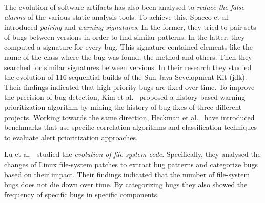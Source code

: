 \documentclass[letterpaper,twocolumn,10pt]{article}
\begin{document}
The evolution of software artifacts has also been analysed to {\it reduce the false
alarms} of the various static analysis tools. To achieve this, Spacco et
al.~\cite{SHP06} introduced {\it pairing} and {\it warning signatures}. In the
former, they tried to pair sets of bugs between versions in order to find
similar patterns. In the latter, they computed a signature for every bug. This
signature contained elements like the name of the class where the bug was found,
the method and others. Then they searched for similar signatures between
versions. In their research they studied the evolution of 116 sequential
builds of the Sun Java Sevelopment Kit ({\sc jdk}). Their findings indicated that
high priority bugs are fixed over time. To improve the precision of bug
detection, Kim et al.~\cite{KE07b} proposed a history-based warning
prioritization algorithm by mining the history of bug-fixes of three
different projects. Working towards the same direction, Heckman
et al.~\cite{HW09,HW08} have introduced benchmarks that use specific
correlation algorithms and classification techniques to evaluate alert
prioritization approaches.

Lu et al.~\cite{LAAL13} studied the {\it evolution of file-system code}.
Specifically, they analysed the changes of Linux file-system patches to extract
bug patterns and categorize bugs based on their impact. Their findings
indicated that the number of file-system bugs does not die down over time. By
categorizing bugs they also showed the frequency of specific bugs in specific
components.
\end{document}
